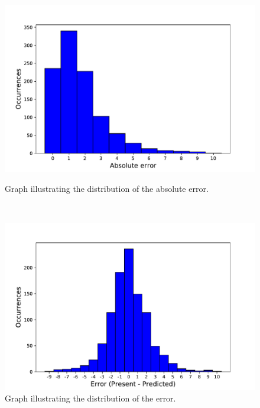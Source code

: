 

\begin{figure}[h!]
\begin{minipage}[b]{8.5cm}
\centering
\includegraphics[width=1\textwidth]{images/absoluteerror}
\caption{Graph illustrating the distribution of the absolute error.}
\label{fig:absoluteerror}
\end{minipage}
\ \hspace{2mm} \hspace{3mm} \
\begin{minipage}[b]{8.5cm}
\centering
\includegraphics[width=1\textwidth]{images/errorpres}
\caption{Graph illustrating the distribution of the error.}
\label{fig:errorpres}
\end{minipage}
\end{figure}

